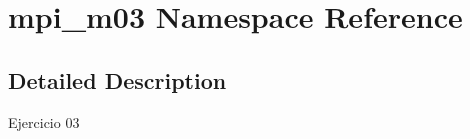 \hypertarget{namespacempi__m03}{\section{mpi\-\_\-m03 Namespace Reference}
\label{namespacempi__m03}
}


\subsection{Detailed Description}
Ejercicio 03 